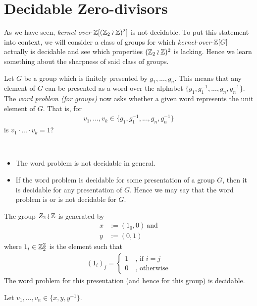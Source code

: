 \section{Decidable Zero-divisors}


As we have seen, \emph{kernel-over-$\mathbb{Z}[(\mathbb{Z}_2 \wr \mathbb{Z})^2]$} is not decidable.
To put this statement into context, we will consider a class of groups for which \emph{kernel-over-$\mathbb{Z}[G]$} actually is decidable and see which properties $(\mathbb{Z}_2 \wr \mathbb{Z})^2$ is lacking.
Hence we learn something about the sharpness of said class of groups.

\begin{Definition}
	Let $G$ be a group which is finitely presented by $g_1,...,g_n$. This means that any element of $G$ can be presented as a word over the alphabet $\{g_1,g_1^{-1},...,g_n,g_n^{-1}\}$. The \emph{word problem (for groups)} now asks whether a given word represents the unit element of $G$. That is, for
	\begin{align*}
		v_1,...,v_k \in \{g_1,g_1^{-1},...,g_n,g_n^{-1}\}
	\end{align*}
	is $v_1 \cdot ... \cdot v_k = 1$?
\end{Definition}

\begin{Remark}
	\
	\begin{itemize}
		\item The word problem is not decidable in general. %
		\item If the word problem is decidable for some presentation of a group $G$, then it is decidable for any presentation of $G$.
			Hence we may say that the word problem is or is not decidable for $G$.
	\end{itemize}
\end{Remark}

\begin{Example}
	The group $Z_2 \wr \mathbb{Z}$ is generated by
	\begin{align*}
		x &:= (1_0,0) ~\text{and} \\
		y &:= (0,1)
	\end{align*}
	where $1_i \in \mathbb{Z}_2^{\mathbb{Z}}$ is the element such that
	\begin{align*}
		 (1_i)_j = \begin{cases} 1~ &\text{, if $i = j$} \\ 0~ &\text{, otherwise} \end{cases}
	\end{align*}
	The word problem for this presentation (and hence for this group) is decidable.
\end{Example}
\proof
	Let $v_1,...,v_n \in \{x,y,y^{-1}\}$.

